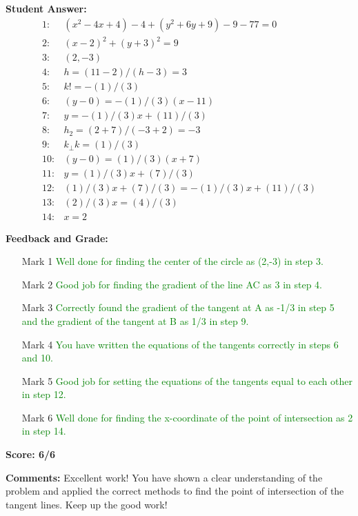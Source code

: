 \documentclass{article}
\begin{document}
\textbf{Student Answer:}
\begin{align*}
1: & (x^{2}-4x+4)-4+(y^{2}+6y+9)-9-77=0 \\
2: & (x-2)^{2}+(y+3)^{2}=9 \\
3: & (2,-3) \\
4: & h=(11-2)/(h-3)=3 \\
5: & k!=-(1)/(3) \\
6: & (y-0)=-(1)/(3)(x-11) \\
7: & y=-(1)/(3)x+(11)/(3) \\
8: & h_2=(2+7)/(-3+2)=-3 \\
9: & k_\perp k=(1)/(3) \\
10: & (y-0)=(1)/(3)(x+7) \\
11: & y=(1)/(3)x+(7)/(3) \\
12: & (1)/(3)x+(7)/(3)=-(1)/(3)x+(11)/(3) \\
13: & (2)/(3)x=(4)/(3) \\
14: & x=2
\end{align*}

\textbf{Feedback and Grade:}
\begin{itemize}
\item[Mark 1] \textcolor{green}{Well done for finding the center of the circle as (2,-3) in step 3.}
\item[Mark 2] \textcolor{green}{Good job for finding the gradient of the line AC as 3 in step 4.}
\item[Mark 3] \textcolor{green}{Correctly found the gradient of the tangent at A as -1/3 in step 5 and the gradient of the tangent at B as 1/3 in step 9.}
\item[Mark 4] \textcolor{green}{You have written the equations of the tangents correctly in steps 6 and 10.}
\item[Mark 5] \textcolor{green}{Good job for setting the equations of the tangents equal to each other in step 12.}
\item[Mark 6] \textcolor{green}{Well done for finding the x-coordinate of the point of intersection as 2 in step 14.}
\end{itemize}

\textbf{Score: 6/6}

\textbf{Comments:} Excellent work! You have shown a clear understanding of the problem and applied the correct methods to find the point of intersection of the tangent lines. Keep up the good work!
\end{document}
